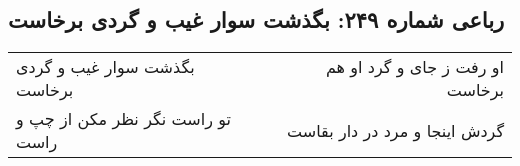 \begin{center}
\section*{رباعی شماره ۲۴۹: بگذشت سوار غیب و گردی برخاست}
\label{sec:0249}
\begin{longtable}{l p{0.5cm} r}
بگذشت سوار غیب و گردی برخاست
&&
او رفت ز جای و گرد او هم برخاست
\\
تو راست نگر نظر مکن از چپ و راست
&&
گردش اینجا و مرد در دار بقاست
\\
\end{longtable}
\end{center}
